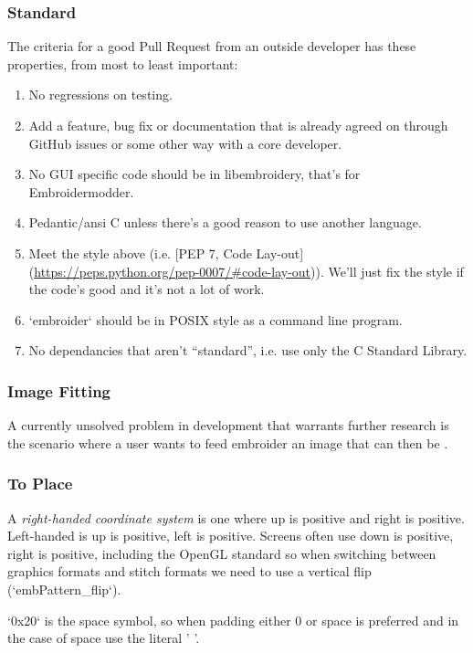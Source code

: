 \documentclass[a4paper, 11pt]{report}
\begin{document}
\subsubsection{Standard}

The criteria for a good Pull Request from an outside developer has these properties, from most to least important:

\begin{enumerate}
\item No regressions on testing.
\item Add a feature, bug fix or documentation that is already agreed on through GitHub issues or some other way with a core developer.
\item No GUI specific code should be in libembroidery, that's for Embroidermodder.
\item Pedantic/ansi C unless there's a good reason to use another language.
\item Meet the style above (i.e. [PEP 7, Code Lay-out](\url{https://peps.python.org/pep-0007/#code-lay-out})).
   We'll just fix the style if the code's good and it's not a lot of work.
\item `embroider` should be in POSIX style as a command line program.
\item No dependancies that aren't ``standard'', i.e. use only the C Standard Library.
\end{enumerate}

\subsubsection{Image Fitting}

A currently unsolved problem in development that warrants further research is
the scenario where a user wants to feed embroider an image that can then be .

\subsubsection{To Place}

A \emph{right-handed coordinate system} is one where up is positive and right is
positive. Left-handed is up is positive, left is positive. Screens often use
down is positive, right is positive, including the OpenGL standard so when
switching between graphics formats and stitch formats we need to use a vertical
flip (`embPattern\_flip`).

`0x20` is the space symbol, so when padding either 0 or space is preferred and in the case of space use the literal ' '.
\end{document}
